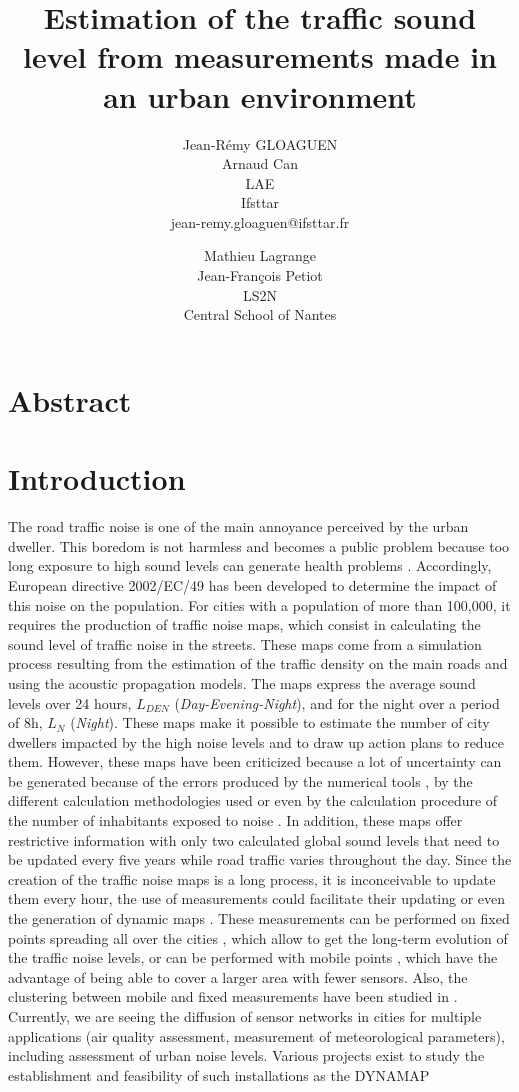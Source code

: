 \documentclass[twocolumn,a4paper,10pt]{article}
\title{Estimation of the traffic sound level from measurements made in an urban environment}
\author{
    Jean-Rémy GLOAGUEN\\
    Arnaud Can\\
    LAE\\
    Ifsttar\\
    jean-remy.gloaguen@ifsttar.fr
  \and
    Mathieu Lagrange\\
	Jean-François Petiot \\
    LS2N\\
    Central School of Nantes\\
}
\date{}
\begin{document}
\maketitle

\section*{Abstract}

\section{Introduction}

The road traffic noise is one of the main annoyance perceived by the urban dweller. This boredom is not harmless and becomes a public problem because too long exposure to high sound levels can generate health problems  \cite{who_burden_2017}.  Accordingly, European directive 2002/EC/49 \cite{directive} has been developed to determine the impact of this noise on the population. For cities with a population of more than 100,000, it requires the production of traffic noise maps, which consist in calculating the sound level of traffic noise in the streets. These maps come from a simulation process resulting from the estimation of the traffic density on the main roads and using the acoustic propagation models. The maps express the average sound levels over 24 hours, $L_ {DEN}$ (\textit{Day-Evening-Night}), and for the night over a period of 8h, $L_N$ (\textit{Night}). These maps make it possible to estimate the number of city dwellers impacted by the high noise levels and to draw up action plans to reduce them. However, these maps have been criticized because a lot of uncertainty can be generated because of the errors produced by the  numerical tools \cite{van_leeuwen_noise_2015}, by the different calculation methodologies used \cite{garg_critical_2014} or even by the calculation procedure of the number of inhabitants exposed to noise \cite{king_implementation_2011}. In addition, these maps offer restrictive information with only two calculated global sound levels that need to be updated every five years while road traffic varies throughout the day. Since the creation of the traffic noise maps is a long process, it is inconceivable to update them every hour, the use of measurements could facilitate their updating or even the generation of dynamic maps \cite{wei_dynamic_2016}. These measurements can be performed on fixed points spreading all over the cities \cite{Mioduszewski} \cite{mietlicki2012innovative}, which allow to get the long-term evolution of the traffic noise levels, or can be performed with  mobile points \cite{can_exploring_2012} \cite{manvell2004sadmam}, which have the advantage of being able to cover a larger area with fewer sensors. Also, the clustering between mobile and fixed measurements have been studied in \cite{can_measurement_2014}. Currently, we are seeing the diffusion of sensor networks in cities for multiple applications (air quality assessment, measurement of meteorological parameters), including assessment of urban noise levels. Various projects exist to study the establishment and feasibility of such installations as the DYNAMAP \cite{dynamap_2016} 
\end{document}
